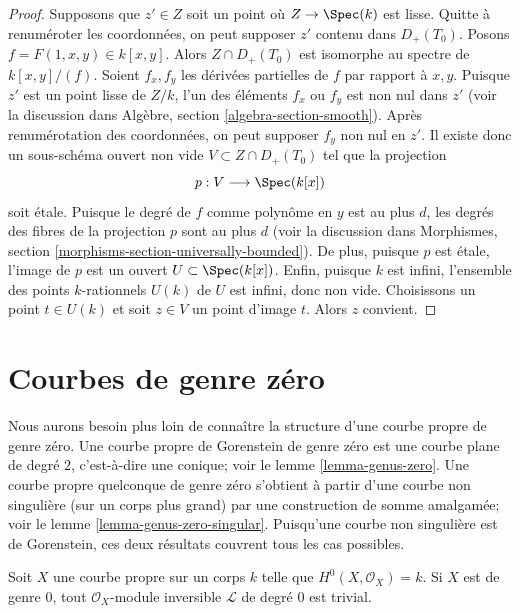 \begin{proof}
Supposons que $z' \in Z$ soit un point où $Z \to \Spec(k)$ est lisse. Quitte à renuméroter les coordonnées, on peut supposer $z'$ contenu dans $D_+(T_0)$. Posons $f = F(1, x, y) \in k[x, y]$. Alors $Z \cap D_+(T_0)$ est isomorphe au spectre de $k[x, y]/(f)$. Soient $f_x, f_y$ les dérivées partielles de $f$ par rapport à $x, y$. Puisque $z'$ est un point lisse de $Z/k$, l'un des éléments $f_x$ ou $f_y$ est non nul dans $z'$ (voir la discussion dans Algèbre, section \ref{algebra-section-smooth}). Après renumérotation des coordonnées, on peut supposer $f_y$ non nul en $z'$. Il existe donc un sous-schéma ouvert non vide $V \subset Z \cap D_{+}(T_0)$ tel que la projection $$
p : V \longrightarrow \Spec(k[x])
$$ soit \'etale. Puisque le degré de $f$ comme polynôme en $y$ est au plus $d$, les degrés des fibres de la projection $p$ sont au plus $d$ (voir la discussion dans Morphismes, section \ref{morphisms-section-universally-bounded}). De plus, puisque $p$ est \'etale, l'image de $p$ est un ouvert $U \subset \Spec(k[x])$. Enfin, puisque $k$ est infini, l'ensemble des points $k$-rationnels $U(k)$ de $U$ est infini, donc non vide. Choisissons un point $t \in U(k)$ et soit $z \in V$ un point d'image $t$. Alors $z$ convient.
\end{proof}





\section{Courbes de genre zéro}
\label{section-genus-zero}

\noindent
Nous aurons besoin plus loin de connaître la structure d'une courbe propre de genre zéro. Une courbe propre de Gorenstein de genre zéro est une courbe plane de degré $2$, c'est-à-dire une conique; voir le lemme \ref{lemma-genus-zero}. Une courbe propre quelconque de genre zéro s'obtient à partir d'une courbe non singulière (sur un corps plus grand) par une construction de somme amalgamée; voir le lemme \ref{lemma-genus-zero-singular}. Puisqu'une courbe non singulière est de Gorenstein, ces deux résultats couvrent tous les cas possibles.

\begin{lemma}
\label{lemma-genus-zero-pic}
Soit $X$ une courbe propre sur un corps $k$ telle que $H^0(X, \mathcal{O}_X) = k$. Si $X$ est de genre $0$, tout $\mathcal{O}_X$-module inversible $\mathcal{L}$ de degré $0$ est trivial.
\end{lemma}

